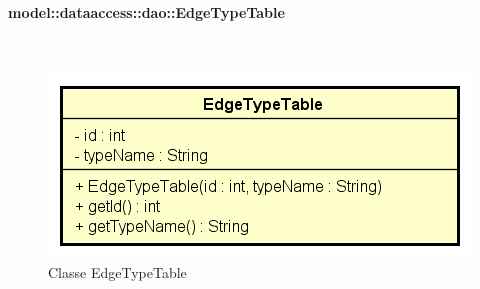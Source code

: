 \documentclass[../DefinizioneDiProdotto.tex]{subfiles}
\begin{document}
\paragraph{model::dataaccess::dao::EdgeTypeTable}
\
\begin{figure}[H]
	\centering
	\includegraphics[width=\maxwidth]{img/EdgeTypeTable.png}
	\caption{Classe EdgeTypeTable}\label{fig:model::dataaccess::dao::EdgeTypeTable} 
\end{figure}
\end{document}
